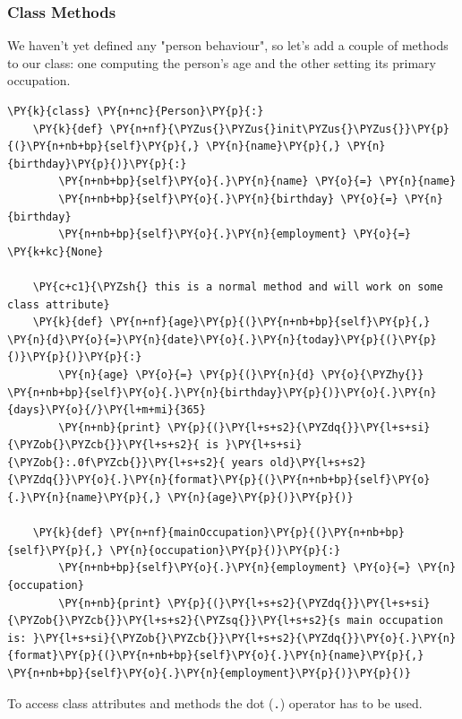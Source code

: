 \subsubsection{Class Methods}

We haven't yet defined any "person behaviour", so let's add a couple
of methods to our class: one computing the person's age and the other
setting its primary occupation.

\begin{codebox}
\begin{Verbatim}[commandchars=\\\{\}]
\PY{k}{class} \PY{n+nc}{Person}\PY{p}{:}
    \PY{k}{def} \PY{n+nf}{\PYZus{}\PYZus{}init\PYZus{}\PYZus{}}\PY{p}{(}\PY{n+nb+bp}{self}\PY{p}{,} \PY{n}{name}\PY{p}{,} \PY{n}{birthday}\PY{p}{)}\PY{p}{:}
        \PY{n+nb+bp}{self}\PY{o}{.}\PY{n}{name} \PY{o}{=} \PY{n}{name}
        \PY{n+nb+bp}{self}\PY{o}{.}\PY{n}{birthday} \PY{o}{=} \PY{n}{birthday}     
        \PY{n+nb+bp}{self}\PY{o}{.}\PY{n}{employment} \PY{o}{=} \PY{k+kc}{None}
                
    \PY{c+c1}{\PYZsh{} this is a normal method and will work on some class attribute}
    \PY{k}{def} \PY{n+nf}{age}\PY{p}{(}\PY{n+nb+bp}{self}\PY{p}{,} \PY{n}{d}\PY{o}{=}\PY{n}{date}\PY{o}{.}\PY{n}{today}\PY{p}{(}\PY{p}{)}\PY{p}{)}\PY{p}{:}
        \PY{n}{age} \PY{o}{=} \PY{p}{(}\PY{n}{d} \PY{o}{\PYZhy{}} \PY{n+nb+bp}{self}\PY{o}{.}\PY{n}{birthday}\PY{p}{)}\PY{o}{.}\PY{n}{days}\PY{o}{/}\PY{l+m+mi}{365}
        \PY{n+nb}{print} \PY{p}{(}\PY{l+s+s2}{\PYZdq{}}\PY{l+s+si}{\PYZob{}\PYZcb{}}\PY{l+s+s2}{ is }\PY{l+s+si}{\PYZob{}:.0f\PYZcb{}}\PY{l+s+s2}{ years old}\PY{l+s+s2}{\PYZdq{}}\PY{o}{.}\PY{n}{format}\PY{p}{(}\PY{n+nb+bp}{self}\PY{o}{.}\PY{n}{name}\PY{p}{,} \PY{n}{age}\PY{p}{)}\PY{p}{)}
        
    \PY{k}{def} \PY{n+nf}{mainOccupation}\PY{p}{(}\PY{n+nb+bp}{self}\PY{p}{,} \PY{n}{occupation}\PY{p}{)}\PY{p}{:}
        \PY{n+nb+bp}{self}\PY{o}{.}\PY{n}{employment} \PY{o}{=} \PY{n}{occupation}
        \PY{n+nb}{print} \PY{p}{(}\PY{l+s+s2}{\PYZdq{}}\PY{l+s+si}{\PYZob{}\PYZcb{}}\PY{l+s+s2}{\PYZsq{}}\PY{l+s+s2}{s main occupation is: }\PY{l+s+si}{\PYZob{}\PYZcb{}}\PY{l+s+s2}{\PYZdq{}}\PY{o}{.}\PY{n}{format}\PY{p}{(}\PY{n+nb+bp}{self}\PY{o}{.}\PY{n}{name}\PY{p}{,} \PY{n+nb+bp}{self}\PY{o}{.}\PY{n}{employment}\PY{p}{)}\PY{p}{)}
\end{Verbatim}
\end{codebox}

To access class attributes and methods the dot (\texttt{.}) operator has to be used.

